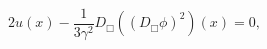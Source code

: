 \begin{equation}
\label{seom-u} 2u(x) -\frac{1}{3\gamma^2}D_\Box\left((D_\Box
\phi)^2\right)(x)=0,
\end{equation}


